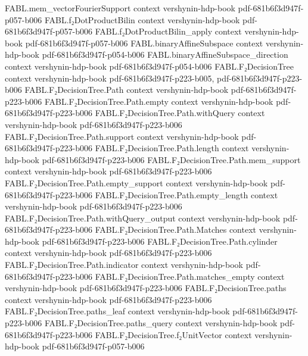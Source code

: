 \begin{theorem}
  {FABL.mem_vectorFourierSupport}
  {context}
  {vershynin-hdp-book}
  {pdf-681b6f3d947f-p057-b006}
\proofstep
  {FABL.f₂DotProductBilin}
  {context}
  {vershynin-hdp-book}
  {pdf-681b6f3d947f-p057-b006}
\proofstep
  {FABL.f₂DotProductBilin_apply}
  {context}
  {vershynin-hdp-book}
  {pdf-681b6f3d947f-p057-b006}
\proofstep
  {FABL.binaryAffineSubspace}
  {context}
  {vershynin-hdp-book}
  {pdf-681b6f3d947f-p054-b006}
\proofstep
  {FABL.binaryAffineSubspace_direction}
  {context}
  {vershynin-hdp-book}
  {pdf-681b6f3d947f-p054-b006}
\proofstep
  {FABL.F₂DecisionTree}
  {context}
  {vershynin-hdp-book}
  {pdf-681b6f3d947f-p223-b005,
    pdf-681b6f3d947f-p223-b006}
\proofstep
  {FABL.F₂DecisionTree.Path}
  {context}
  {vershynin-hdp-book}
  {pdf-681b6f3d947f-p223-b006}
\proofstep
  {FABL.F₂DecisionTree.Path.empty}
  {context}
  {vershynin-hdp-book}
  {pdf-681b6f3d947f-p223-b006}
\proofstep
  {FABL.F₂DecisionTree.Path.withQuery}
  {context}
  {vershynin-hdp-book}
  {pdf-681b6f3d947f-p223-b006}
\proofstep
  {FABL.F₂DecisionTree.Path.support}
  {context}
  {vershynin-hdp-book}
  {pdf-681b6f3d947f-p223-b006}
\proofstep
  {FABL.F₂DecisionTree.Path.length}
  {context}
  {vershynin-hdp-book}
  {pdf-681b6f3d947f-p223-b006}
\proofstep
  {FABL.F₂DecisionTree.Path.mem_support}
  {context}
  {vershynin-hdp-book}
  {pdf-681b6f3d947f-p223-b006}
\proofstep
  {FABL.F₂DecisionTree.Path.empty_support}
  {context}
  {vershynin-hdp-book}
  {pdf-681b6f3d947f-p223-b006}
\proofstep
  {FABL.F₂DecisionTree.Path.empty_length}
  {context}
  {vershynin-hdp-book}
  {pdf-681b6f3d947f-p223-b006}
\proofstep
  {FABL.F₂DecisionTree.Path.withQuery_output}
  {context}
  {vershynin-hdp-book}
  {pdf-681b6f3d947f-p223-b006}
\proofstep
  {FABL.F₂DecisionTree.Path.Matches}
  {context}
  {vershynin-hdp-book}
  {pdf-681b6f3d947f-p223-b006}
\proofstep
  {FABL.F₂DecisionTree.Path.cylinder}
  {context}
  {vershynin-hdp-book}
  {pdf-681b6f3d947f-p223-b006}
\proofstep
  {FABL.F₂DecisionTree.Path.indicator}
  {context}
  {vershynin-hdp-book}
  {pdf-681b6f3d947f-p223-b006}
\proofstep
  {FABL.F₂DecisionTree.Path.matches_empty}
  {context}
  {vershynin-hdp-book}
  {pdf-681b6f3d947f-p223-b006}
\proofstep
  {FABL.F₂DecisionTree.paths}
  {context}
  {vershynin-hdp-book}
  {pdf-681b6f3d947f-p223-b006}
\proofstep
  {FABL.F₂DecisionTree.paths_leaf}
  {context}
  {vershynin-hdp-book}
  {pdf-681b6f3d947f-p223-b006}
\proofstep
  {FABL.F₂DecisionTree.paths_query}
  {context}
  {vershynin-hdp-book}
  {pdf-681b6f3d947f-p223-b006}
\proofstep
  {FABL.F₂DecisionTree.f₂UnitVector}
  {context}
  {vershynin-hdp-book}
  {pdf-681b6f3d947f-p057-b006}

\end{theorem}
